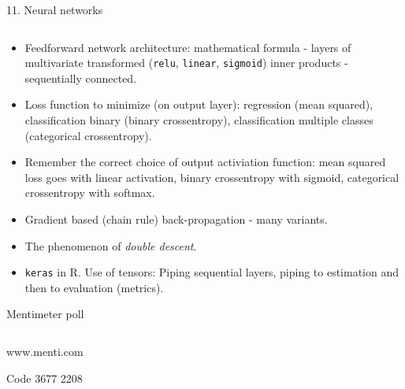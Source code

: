 \documentclass[10pt,ignorenonframetext,]{beamer}
\begin{document}
\begin{frame}[fragile]

\begin{block}{11. Neural networks}

\(~\)

\begin{itemize}
\item
  Feedforward network architecture: mathematical formula - layers of
  multivariate transformed (\texttt{relu}, \texttt{linear},
  \texttt{sigmoid}) inner products - sequentially connected.
  \vspace{2mm}
\item
  Loss function to minimize (on output layer): regression (mean
  squared), classification binary (binary crossentropy), classification
  multiple classes (categorical crossentropy). \vspace{2mm}
\item
  Remember the correct choice of output activiation function: mean
  squared loss goes with linear activation, binary crossentropy with
  sigmoid, categorical crossentropy with softmax. \vspace{2mm}
\item
  Gradient based (chain rule) back-propagation - many variants.
  \vspace{2mm}
\item
  The phenomenon of \emph{double descent}. \vspace{2mm}
\item
  \texttt{keras} in R. Use of tensors: Piping sequential layers, piping
  to estimation and then to evaluation (metrics).
\end{itemize}

\end{block}

\end{frame}

\begin{frame}{Mentimeter poll}
\protect\hypertarget{mentimeter-poll}{}

\(~\)

\centering

www.menti.com

Code 3677 2208

\end{frame}
\end{document}
